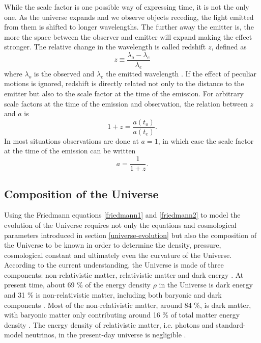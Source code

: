 \documentclass[english, twoside]{HYgradu}
\begin{document}
While the scale factor is one possible way of expressing time, it is not the only one. As the universe expands and we observe objects receding, the light emitted from them is shifted to longer wavelengths. The further away the emitter is, the more the space between the observer and emitter will expand making the effect stronger. The relative change in the wavelength is called redshift $z$, defined as
\begin{equation}
z \equiv \frac{\lambda_o - \lambda_e}{\lambda_e}
\end{equation}
where $\lambda_o$ is the observed and $\lambda_e$ the emitted wavelength \citep{mo2010galaxy}. If the effect of peculiar motions is ignored, redshift is directly related not only to the distance to the emitter but also to the scale factor at the time of the emission. For arbitrary scale factors at the time of the emission and observation, the relation between $z$ and $a$ is \citep{mo2010galaxy}
\begin{equation}
1 + z = \frac{a(t_o)}{a(t_e)}.
\end{equation}
In most situations observations are done at $a=1$, in which case the scale factor at the time of the emission can be written
\begin{equation}
a = \frac{1}{1+z}.
\end{equation}


\subsection{Composition of the Universe} \label{universe-composition}
Using the Friedmann equations \ref{friedmann1} and \ref{friedmann2} to model the evolution of the Universe requires not only the equations and cosmological parameters introduced in section \ref{universe-evolution} but also the composition of the Universe to be known in order to determine the density, pressure, cosmological constant and ultimately even the curvature of the Universe. According to the current understanding, the Universe is made of three components: non-relativistic matter, relativistic matter and dark energy \citep{mo2010galaxy}. At present time, about 69 \% of the energy density $\rho$ in the Universe is dark energy and 31 \% is non-relativistic matter, including both baryonic and dark components \citep{planck2016resultsI}. Most of the non-relativistic matter, around 84 \%, is dark matter, with baryonic matter only contributing around 16 \% of total matter energy density \citep{planck2016resultsI}. The energy density of relativistic matter, i.e. photons and standard-model neutrinos, in the present-day universe is negligible \citep{mo2010galaxy}.
\end{document}
